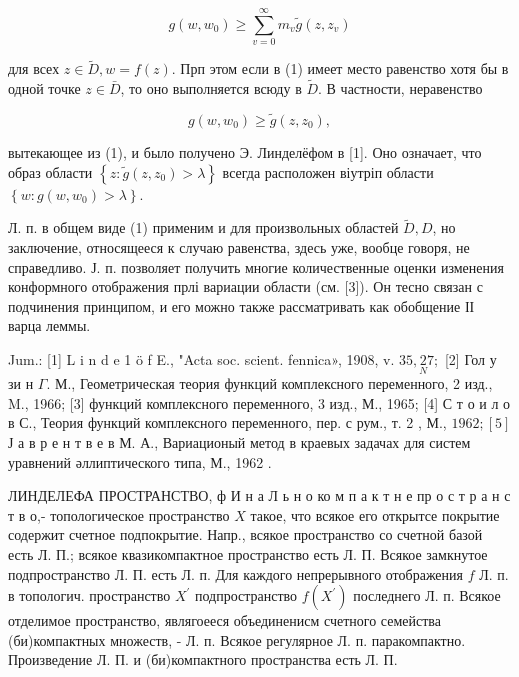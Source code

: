 \documentclass[10pt]{article}
\begin{document}
\[

g\left(w, w_{0}\right) \geqslant \sum_{v=0}^{\infty} m_{v} \tilde{g}\left(z, z_{v}\right)

\]



для всех $z \in \tilde{D}, w=f(z)$. Прп этом если в (1) имеет место равенство хотя бы в одной точке $z \in \bar{D}$, то оно выполняется всюду в $\widetilde{D}$. В частности, неравенство



\[

g\left(w, w_{0}\right) \geqslant \tilde{g}\left(z, z_{0}\right),

\]



вытекающее из (1), и было получено Э. Линделёфом в [1]. Оно означает, что образ области $\left\{z: \tilde{g}\left(z, z_{0}\right)>\lambda\right\}$ всегда расположен віутріп области $\left\{w: g\left(w, w_{0}\right)>\lambda\right\}$.



Л. п. в общем виде (1) применим и для произвольных областей $\tilde{D}, D$, но заключение, относящееся к случаю равенства, здесь уже, вообце говоря, не справедливо. Ј. п. позволяет получить многие количественные оценки изменения конформного отображения прлі вариации области (см. [3]). Он тесно связан с подчинения принципом, и его можно также рассматривать как обобщение ІІ варца леммы.



Jum.: [1] L i n d e 1 ö f E., "Acta soc. scient. fennica», 1908, v. $35, \underset{N}{2} 7 ;$ [2] Гол у зи н $\Gamma$. М., Геометрическая теория функций комплексного переменного, 2 изд., M., 1966; [3] функций комплексного переменного, 3 изд., М., 1965; [4] С т о и л о в С., Теория функций комплексного переменного, пер. с рум., т. 2 , М., $1962 ;[5]$ Ј а в р е н т в е в М. А., Вариационый метод в краевых задачах для систем уравнений әллиптического типа, М., 1962 .



ЛИНДЕЛЕФА ПРОСТРАНСТВО, ф И н а Л ь н о ко м п а к т н е пр о с т р а н с т в о,- топологическое пространство $X$ такое, что всякое его открытсе покрытие содержит счетное подпокрытие. Напр., всякое пространство со счетной базой есть Л. П.; всякое квазикомпактное пространство есть Л. П. Всякое замкнутое подпространство Л. П. есть Л. п. Для каждого непрерывного отображения $f$ Л. п. в топологич. пространство $X^{\prime}$ подпространство $f\left(X^{\prime}\right)$ последнего Л. п. Всякое отделимое пространство, являгоееся объединенисм счетного семейства (би)компактных множеств, - Л. п. Всякое регулярное Л. п. паракомпактно. Произведение Л. П. и (би)компактного пространства есть Л. П.
\end{document}
